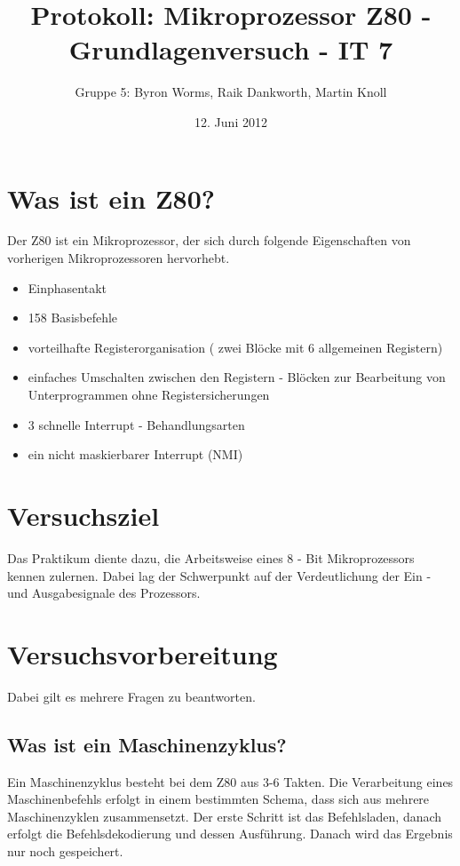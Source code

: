 \documentclass[a4paper,11pt]{article}
\title{Protokoll: Mikroprozessor Z80 - Grundlagenversuch - IT 7}
\author{Gruppe 5: Byron Worms, Raik Dankworth, Martin Knoll}
\date{12. Juni 2012}
\begin{document}
\begin{titlepage}
\maketitle
\end{titlepage}

\section{Was ist ein Z80?}

Der Z80 ist ein Mikroprozessor, der sich durch folgende Eigenschaften von vorherigen Mikroprozessoren hervorhebt. 
\begin{itemize}
\item Einphasentakt
\item 158 Basisbefehle
\item vorteilhafte Registerorganisation ( zwei Blöcke mit 6 allgemeinen Registern)
\item einfaches Umschalten zwischen den Registern - Blöcken zur Bearbeitung 		von Unterprogrammen ohne Registersicherungen
\item 3 schnelle Interrupt - Behandlungsarten
\item ein nicht maskierbarer Interrupt (NMI)
\end{itemize}

\section{Versuchsziel}

Das Praktikum diente dazu, die Arbeitsweise eines 8 - Bit Mikroprozessors kennen zulernen. Dabei lag der Schwerpunkt auf der Verdeutlichung der Ein - und Ausgabesignale des Prozessors. 

\section{Versuchsvorbereitung}

Dabei gilt es mehrere Fragen zu beantworten.

\subsection{Was ist ein Maschinenzyklus?}

Ein Maschinenzyklus besteht bei dem Z80 aus 3-6 Takten. Die Verarbeitung eines Maschinenbefehls erfolgt in einem bestimmten Schema, dass sich aus mehrere Maschinenzyklen zusammensetzt. Der erste Schritt ist das Befehlsladen, danach erfolgt die Befehlsdekodierung und dessen Ausführung. Danach wird das Ergebnis nur noch gespeichert.
\end{document}
